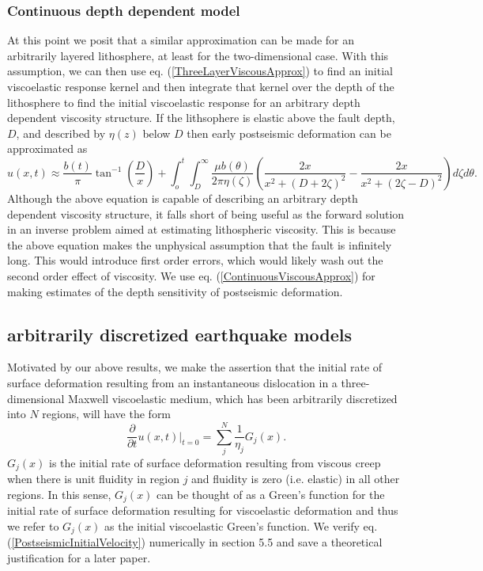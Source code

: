 \documentclass[fleqn,12pt]{article}
\begin{document}
\subsubsection{Continuous depth dependent model}
At this point we posit that a similar approximation can be made for an
arbitrarily layered lithosphere, at least for the two-dimensional
case.  With this assumption, we can then use
eq. (\ref{ThreeLayerViscousApprox}) to find an initial viscoelastic
response kernel and then integrate that kernel over the depth of the
lithosphere to find the initial viscoelastic response for an arbitrary
depth dependent viscosity structure.  If the lithsophere is elastic
above the fault depth, $D$, and described by $\eta(z)$ below $D$ then
early postseismic deformation can be approximated as
\begin{equation}\label{ContinuousViscousApprox}
u(x,t) \approx \frac{b(t)}{\pi}\tan^{-1}(\frac{D}{x}) + 
               \int_o^t\int_D^\infty \frac{\mu b(\theta)}{2\pi\eta(\zeta)}
                                    \left(\frac{2x}{x^2 + \left(D + 2\zeta\right)^2} - 
                                    \frac{2x}{x^2 + \left(2\zeta - D\right)^2}\right)
                                    d\zeta d\theta.
\end{equation}
Although the above equation is capable of describing an arbitrary
depth dependent viscosity structure, it falls short of being useful as
the forward solution in an inverse problem aimed at estimating
lithospheric viscosity.  This is because the above equation makes the
unphysical assumption that the fault is infinitely long.  This would
introduce first order errors, which would likely wash out the second
order effect of viscosity. We use eq. (\ref{ContinuousViscousApprox})
for making estimates of the depth sensitivity of postseismic
deformation.

\subsection{arbitrarily discretized earthquake models}
Motivated by our above results, we make the assertion that the initial
rate of surface deformation resulting from an instantaneous
dislocation in a three-dimensional Maxwell viscoelastic
medium, which has been arbitrarily discretized into $N$ regions, will
have the form
\begin{equation}\label{PostseismicInitialVelocity}
  \frac{\partial}{\partial t}u(x,t)\big|_{t=0} = \sum_j^N\frac{1}{\eta_j}G_j(x).
\end{equation}
$G_j(x)$ is the initial rate of surface deformation resulting from
viscous creep when there is unit fluidity in region $j$ and fluidity
is zero (i.e. elastic) in all other regions.  In this sense, $G_j(x)$
can be thought of as a Green's function for the initial rate of
surface deformation resulting for viscoelastic deformation and thus we
refer to $G_j(x)$ as the initial viscoelastic Green's function.  We
verify eq. (\ref{PostseismicInitialVelocity}) numerically in section 5.5
and save a theoretical justification for a later paper.
\end{document}
